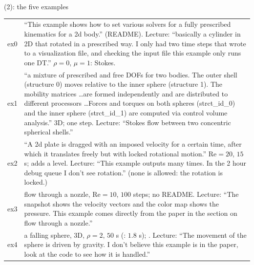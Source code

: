 \documentclass[aspectratio=169,11pt]{beamer}
\begin{document}
\begin{frame}{ (2): the five examples}
\label{fr:cib2}
\scriptsize
\setlength{\tabcolsep}{3pt}
\begin{tabular}{@{}lL{0.9\textwidth}@{}}
\toprule
ex0 & ``This example shows how to set various solvers for a fully prescribed kinematics for a 2d body.'' (README). Lecture: ``basically a cylinder in 2D that rotated in a prescribed way. I only had two time steps that wrote to a visualization file, and checking the input file this example only runs one DT.'' $\rho = 0$, $\mu = 1$: Stokes.\\
ex1 & ``a mixture of prescribed and free DOFs for two bodies. The outer shell (structure 0) moves relative to the inner sphere (structure 1). The mobility matrices \ldots are formed independently and are distributed to different processors \ldots Forces and torques on both spheres (strct\_id\_0) and the inner sphere (strct\_id\_1) are computed via control volume analysis.'' 3D; one step. Lecture: ``Stokes flow between two concentric spherical shells.''\\
ex2 & ``A 2d plate is dragged with an imposed velocity for a certain time, after which it translates freely but with locked rotational motion.'' $\mathrm{Re} = 20$, $15$ s;  adds a level. Lecture: ``This example outputs many times. In the 2 hour debug queue I don't see rotation.'' (none is allowed: the rotation is locked.)\\
ex3 & flow through a nozzle, $\mathrm{Re} = 10$, $100$ steps; no README. Lecture: ``The snapshot shows the velocity vectors and the color map shows the pressure. This example comes directly from the paper in the section on flow through a nozzle.''\\
ex4 & a falling sphere, 3D, $\rho = 2$, $50$ s (: $1.8$ s); . Lecture: ``The movement of the sphere is driven by gravity. I don't believe this example is in the paper, look at the code to see how it is handled.''\\
\bottomrule
\end{tabular}
\end{frame}
\end{document}
